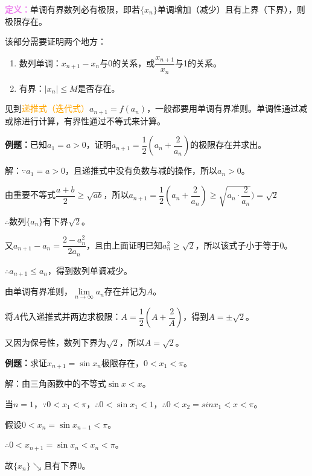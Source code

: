 \documentclass[UTF8, 12pt]{ctexart}
\begin{document}
        \textcolor{violet}{\textbf{定义：}}单调有界数列必有极限，即若$\{x_n\}$单调增加（减少）且有上界（下界），则极限存在。

        该部分需要证明两个地方：

        \begin{enumerate}
            \item 数列单调：$x_{n+1}-x_n$与0的关系，或$\dfrac{x_{n+1}}{x_n}$与1的关系。
            \item 有界：$\vert x_n\vert\leqslant M$是否存在。
        \end{enumerate}

        见到\textcolor{orange}{递推式（迭代式）}$a_{n+1}=f(a_n)$，一般都要用单调有界准则。单调性通过减或除进行计算，有界性通过不等式来计算。

        \textbf{例题：}已知$a_1=a>0$，证明$a_{n+1}=\dfrac{1}{2}\left(a_n+\dfrac{2}{a_n}\right)$的极限存在并求出。

        解：$\because a_1=a>0$，且递推式中没有负数与减的操作，所以$a_n>0$。

        由重要不等式$\dfrac{a+b}{2}\geqslant\sqrt{ab}$，所以$a_{n+1}=\dfrac{1}{2}\left(a_n+\dfrac{2}{a_n}\right)\geqslant\sqrt{a_n\cdot\dfrac{2}{a_n}})=\sqrt{2}$

        $\therefore$数列$\{a_n\}$有下界$\sqrt{2}$。

        又$a_{n+1}-a_n=\dfrac{2-a_n^2}{2a_n}$，且由上面证明已知$a_n^2\geqslant\sqrt{2}$，所以该式子小于等于0。

        $\therefore a_{n+1}\leqslant a_n$，得到数列单调减少。

        由单调有界准则，$\lim\limits_{n\to\infty}a_n$存在并记为$A$。

        将$A$代入递推式并两边求极限：$A=\dfrac{1}{2}(A+\dfrac{2}{A})$，得到$A=\pm\sqrt{2}$。

        又因为保号性，数列下界为$\sqrt{2}$，所以$A=\sqrt{2}$。

        \textbf{例题：}求证$x_{n+1}=\sin x_n$极限存在，$0<x_1<\pi$。

        解：由三角函数中的不等式$\sin x<x$。

        当$n=1$，$\because 0<x_1<\pi$，$\therefore 0<\sin x_1<1$，$\therefore 0<x_2=sin x_1<x<\pi$。

        假设$0<x_n=\sin x_{n-1}<\pi$。

        $\therefore 0<x_{n+1}=\sin x_n<x_n<\pi$。

        故$\{x_n\}\searrow$且有下界0。
\end{document}
